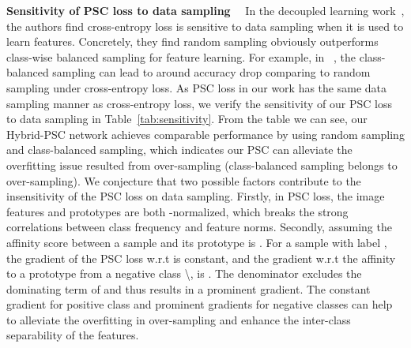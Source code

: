 \documentclass[final]{cvpr}
\begin{document}
\par{\textbf{Sensitivity of PSC loss to data sampling}}~~
In the decoupled learning work~\cite{Decoupling,BBN}, the authors find cross-entropy loss is sensitive to data sampling when it is used to learn features. Concretely, they find random sampling obviously outperforms class-wise balanced sampling for feature learning. For example, in ~\cite{Decoupling}, the class-balanced sampling can lead to around  accuracy drop comparing to random sampling under cross-entropy loss. As PSC loss in our work has the same data sampling manner as cross-entropy loss, we verify the sensitivity of our PSC loss to data sampling in Table~\ref{tab:sensitivity}. From the table we can see, our Hybrid-PSC network achieves comparable performance by using random sampling and class-balanced sampling, which indicates our PSC can alleviate the overfitting issue resulted from over-sampling (class-balanced sampling belongs to over-sampling). We conjecture that two possible factors contribute to the insensitivity of the PSC loss on data sampling. Firstly, in PSC loss, the image features and prototypes are both -normalized, which breaks the strong correlations between class frequency and feature norms. Secondly, assuming the affinity score between a sample and its prototype is . For a sample  with label , the gradient of the PSC loss  w.r.t  is constant, and the gradient w.r.t the affinity to a prototype from a negative class \textbackslash , 
is . The denominator excludes the dominating term of  and thus results in a prominent gradient. The constant gradient for positive class and prominent gradients for negative classes can help to alleviate the overfitting in over-sampling and enhance the inter-class separability of the features.
\end{document}
